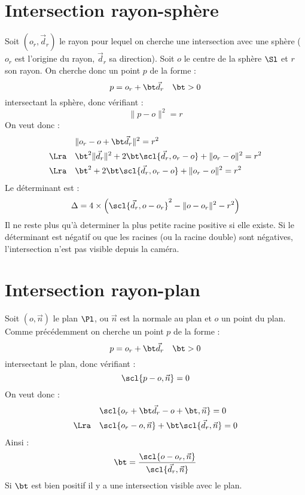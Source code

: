 \newpage\section{Intersection rayon-sphère}
\ni Soit $(o_r, \vec{d}_r)$ le rayon pour lequel on cherche une intersection
avec une sphère ($o_r$ est l'origine du rayon, $\vec{d}_r$ sa direction). Soit $o$ le
centre de la sphère $\Sl$ et $r$ son rayon. On cherche donc un point $p$ de la forme
:
$$p = o_r + \bt \vec{d}_r\quad \bt>0$$
\ni intersectant la sphère, donc vérifiant :
$$\|p - o\|^2 = r$$
\ni On veut donc :
\begin{align*}
	&\|o_r - o + \bt \vec{d}_r\|^2=r^2\\
	\Lra\quad&\bt^2\|\vec{d}_r\|^2 + 2\bt\scl{\vec{d}_r, o_r - o} 
	+\|o_r - o\|^2 =r^2\\
	\Lra\quad&\bt^2 + 2\bt\scl{\vec{d}_r, o_r - o} +\|o_r - o\|^2 =r^2
\end{align*}
\ni Le déterminant est :
$$\Delta = 4\times\left(\scl{\vec{d}_r, o - o_r}^2 - \|o - o_r\|^2 - 
r^2\right)$$
\ni Il ne reste plus qu'à determiner la plus petite racine positive si elle
existe. Si le déterminant est négatif ou que les racines (ou la racine double)
sont négatives, l'intersection n'est pas visible depuis la caméra.

\section{Intersection rayon-plan}
\ni Soit $(o,\vec{n})$ le plan $\Pl$, ou $\vec{n}$ est la normale au plan et $o$
un point du plan. Comme précédemment on cherche un point $p$ de la forme :
$$p = o_r + \bt \vec{d}_r\quad \bt>0$$
\ni intersectant le plan, donc vérifiant :
$$\scl{p - o, \vec{n}} = 0$$
\ni On veut donc :
\begin{align*}
	&\scl{o_r + \bt \vec{d}_r - o + \bt, \vec{n}}=0\\
	\Lra\quad&\scl{o_r - o, \vec{n}} + \bt \scl{\vec{d}_r,\vec{n}}=0\\
\end{align*}
Ainsi :
$$\bt = \frac{\scl{o - o_r, \vec{n}}}{\scl{\vec{d}_r,\vec{n}}}$$
\ni Si $\bt$ est bien positif il y a une intersection visible avec le plan.

